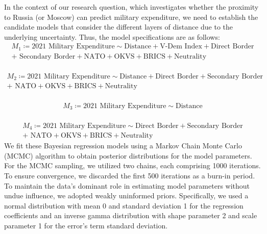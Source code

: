 \documentclass[12pt,a4paper]{article}
\begin{document}
In the context of our research question, which investigates whether the proximity to Russia (or Moscow) can predict military expenditure, we need to establish the candidate models that consider the different layers of distance due to the underlying uncertainty. Thus, the model specifications are as follows: 
\begin{align}
 M_1 \coloneqq \textrm{2021 Military Expenditure} \sim \textrm{Distance} + \textrm{V-Dem Index} + \textrm{Direct Border} \\ +  \textrm{ Secondary Border} +  \textrm{NATO} + \textrm{OKVS} + \textrm{BRICS} + \textrm{Neutrality} \nonumber
\end{align}\\[-3.1em]
\begin{align}
 M_2 \coloneqq \textrm{2021 Military Expenditure} \sim \textrm{Distance} + \textrm{Direct Border} + \textrm{Secondary Border} \\ + \textrm{ NATO} + \textrm{OKVS} + \textrm{BRICS} + \textrm{Neutrality} \nonumber
\end{align}\\[-3.1em]
\begin{align}
M_3 \coloneqq \textrm{2021 Military Expenditure} \sim \textrm{Distance} 
\end{align}\\[-3.1em]
\begin{align}
  M_4 \coloneqq \textrm{2021 Military Expenditure} \sim \textrm{Direct Border} + \textrm{Secondary Border} \\ + \textrm{ NATO} + \textrm{OKVS} + \textrm{BRICS} + \textrm{Neutrality} \nonumber
\end{align}
We fit these Bayesian regression models using a Markov Chain Monte Carlo (MCMC) algorithm to obtain posterior distributions for the model parameters. 
For the MCMC sampling, we utilized two chains, each comprising 1000 iterations. To ensure convergence, we discarded the first 500 iterations as a burn-in period. To maintain the data's dominant role in estimating model parameters without undue influence, we adopted weakly uninformed priors. Specifically, we used a normal distribution with mean 0 and standard deviation 1 for the regression coefficients and an inverse gamma distribution with shape parameter 2 and scale parameter 1 for the error's term standard deviation.
\end{document}
